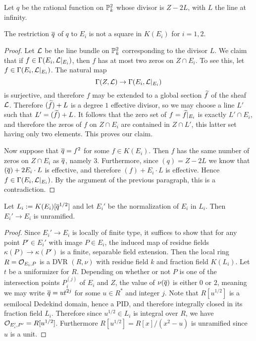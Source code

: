 Let $q$ be the rational function on $\mathbb{P}^2_k$ whose divisor is $Z-2L$, with $L$ the line at infinity.
\begin{lem}
The restriction $\overline{q}$ of $q$ to $E_i$ is not a square in $K(E_i)$ for $i=1,2$.
\end{lem}
\begin{proof}
Let $\mathcal{L}$ be the line bundle on $\mathbb{P}^2_k$ corresponding to the divisor $L$.  We claim that if $f\in \Gamma(E_i,\mathcal{L}|_{E_i})$, then $f$ has at most two zeros on $Z\cap E_i$.  To see this, let $f\in \Gamma(E_i,\mathcal{L}|_{E_i})$.  The natural map
$$\Gamma(Z,\mathcal{L})\rightarrow\Gamma(E_i,\mathcal{L}|_{E_i})$$
is surjective, and therefore $f$ may be extended to a global section $\widetilde f$ of the sheaf $\mathcal{L}$.  Therefore $(\widetilde f) + L$ is a degree $1$ effective divisor, so we may choose a line $L'$ such that $L' = (\widetilde f) + L$.  It follows that the zero set of $f = \widetilde f|_{E_i}$ is exactly $L'\cap E_i$, and therefore the zeros of $f$ on $Z\cap E_i$ are contained in $Z\cap L'$, this latter set having only two elements.  This proves our claim.

Now suppose that $\overline{q} = f^2$ for some $f\in K(E_i)$.  Then $f$ has the same number of zeros on $Z\cap E_i$ as $\overline{q}$, namely $3$.  Furthermore, since $(q) = Z-2L$ we know that $(\overline{q}) + 2E_i\cdot L$ is effective, and therefore $(f) + E_i\cdot L$ is effective.  Hence $f\in \Gamma(E_i,\mathcal{L}|_{E_i})$.  By the argument of the previous paragraph, this is a contradiction.
\end{proof}

\begin{lem}
Let $L_i:=K(E_i)[\overline{q}^{1/2}]$ and let $E_i'$ be the normalization of $E_i$ in $L_i$.  Then $E_i'\rightarrow E_i$ is unramified.
\end{lem}
\begin{proof}
Since $E_i'\rightarrow E_i$ is locally of finite type, it suffices to show that for any point $P'\in E_i'$ with image $P\in E_i$, the induced map of residue fields $\kappa(P)\rightarrow\kappa(P')$ is a finite, separable field extension.  Then the local ring $R = \mathcal{O}_{E_i,P}$ is a DVR $(R,\nu)$ with residue field $k$ and fraction field $K(L_i)$.  Let $t$ be a uniformizer for $R$.  Depending on whether or not $P$ is one of the intersection points $P_i^{(j)}$ of $E_i$ and $Z$, the value of $\nu(\overline{q})$ is either $0$ or $2$, meaning we may write $\overline{q} = ut^{2j}$ for some $u\in R^*$ and integer $j$.  Note that $R[u^{1/2}]$ is a semilocal Dedekind domain, hence a PID, and therefore integrally closed in its fraction field $L_i$.  Therefore since $u^{1/2}\in L_i$ is integral over $R$, we have $\mathcal{O}_{E_i',P'} = R[u^{1/2}]$.  Furthermore $R[u^{1/2}] = R[x]/(x^2-u)$ is unramified since $u$ is a unit.
\end{proof}

